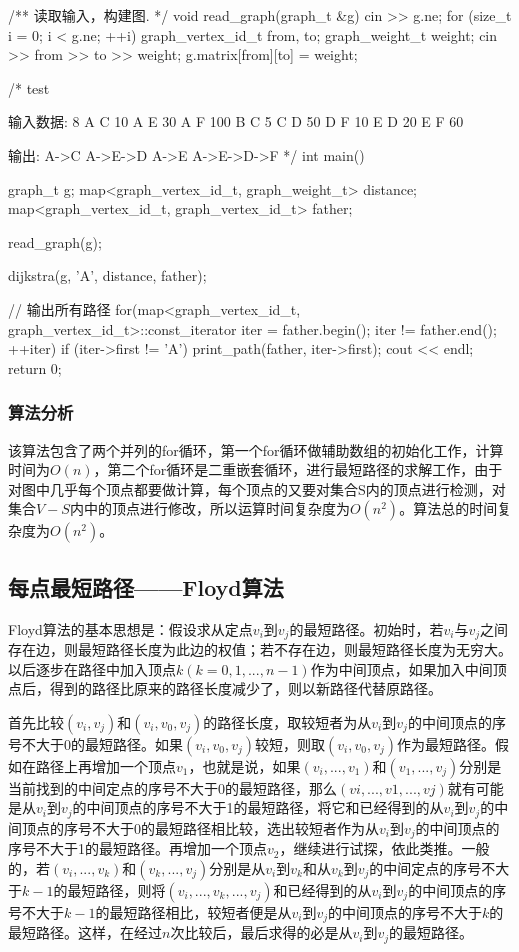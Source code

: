 \begin{Codex}[label=al_graph_dijkstra.cpp]
/** 读取输入，构建图. */
void read_graph(graph_t &g) {
    cin >> g.ne;
    for (size_t i = 0; i < g.ne; ++i) {
        graph_vertex_id_t from, to;
        graph_weight_t weight;
        cin >> from >> to >> weight;
        g.matrix[from][to] = weight;
    }
}

/* test

输入数据:
8
A C 10
A E 30
A F 100
B C 5
C D 50
D F 10
E D 20
E F 60

输出:
A->C
A->E->D
A->E
A->E->D->F
*/
int main() {
    graph_t g;
    map<graph_vertex_id_t, graph_weight_t> distance;
    map<graph_vertex_id_t, graph_vertex_id_t> father;

    read_graph(g);

    dijkstra(g, 'A', distance, father);

    // 输出所有路径
    for(map<graph_vertex_id_t, graph_vertex_id_t>::const_iterator iter =
            father.begin(); iter != father.end();  ++iter) {
        if (iter->first != 'A') {
            print_path(father, iter->first);
            cout << endl;
        }
    }
    return 0;
}
\end{Codex}

\subsubsection{算法分析}
该算法包含了两个并列的for循环，第一个for循环做辅助数组的初始化工作，计算时间为$O(n)$，第二个for循环是二重嵌套循环，进行最短路径的求解工作，由于对图中几乎每个顶点都要做计算，每个顶点的又要对集合S内的顶点进行检测，对集合$V-S$内中的顶点进行修改，所以运算时间复杂度为$O(n^2)$。算法总的时间复杂度为$O(n^2)$。


\subsection{每点最短路径——Floyd算法}
Floyd算法的基本思想是：假设求从定点$v_i$到$v_j$的最短路径。初始时，若$v_i$与$v_j$之间存在边，则最短路径长度为此边的权值；若不存在边，则最短路径长度为无穷大。以后逐步在路径中加入顶点$k(k=0,1,...,n-1)$作为中间顶点，如果加入中间顶点后，得到的路径比原来的路径长度减少了，则以新路径代替原路径。

首先比较$(v_i,v_j)$和$(v_i,v_0,v_j)$的路径长度，取较短者为从$v_i$到$v_j$的中间顶点的序号不大于0的最短路径。如果$(v_i,v_0,v_j)$较短，则取$(v_i,v_0,v_j)$作为最短路径。假如在路径上再增加一个顶点$v_1$，也就是说，如果$(v_i,...,v_1)$和$(v_1,...,v_j)$分别是当前找到的中间定点的序号不大于0的最短路径，那么$(vi,...,v1,...,vj)$就有可能是从$v_i$到$v_j$的中间顶点的序号不大于1的最短路径，将它和已经得到的从$v_i$到$v_j$的中间顶点的序号不大于0的最短路径相比较，选出较短者作为从$v_i$到$v_j$的中间顶点的序号不大于1的最短路径。再增加一个顶点$v_2$，继续进行试探，依此类推。一般的，若$(v_i,...,v_k)$和$(v_k,...,v_j)$分别是从$v_i$到$v_k$和从$v_k$到$v_j$的中间定点的序号不大于$k-1$的最短路径，则将$(v_i,...,v_k,...,v_j)$和已经得到的从$v_i$到$v_j$的中间顶点的序号不大于$k-1$的最短路径相比，较短者便是从$v_i$到$v_j$的中间顶点的序号不大于$k$的最短路径。这样，在经过$n$次比较后，最后求得的必是从$v_i$到$v_j$的最短路径。

